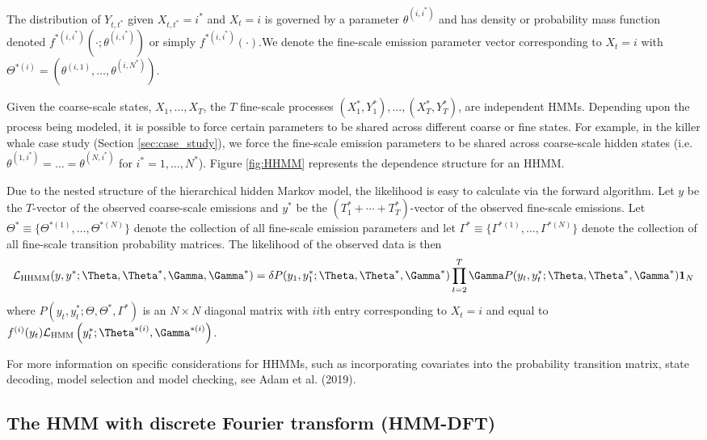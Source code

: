 The distribution of $Y_{t, t^*}$ given $X_{t, t^*}=i^*$ and $X_t=i$ is governed by a parameter $\theta^{(i,i^*)}$ and has density or probability mass function denoted $f^{*(i,i^*)}\left(\cdot; \theta^{(i,i^*)}\right)$ or simply $f^{*(i,i^*)}(\cdot)$.We denote the fine-scale emission parameter vector corresponding to $X_t=i$ with $\Theta^{*(i)}=\left(\theta^{(i,1)}, \ldots, \theta^{(i,N^*)}\right)$.

Given the coarse-scale states, $X_1,\ldots, X_T$, the $T$ fine-scale processes $(X_1^*, Y_1^*), \ldots, (X_T^*, Y_T^*)$, are independent HMMs. Depending upon the process being modeled, it is possible to force certain parameters to be shared across different coarse or fine states. For example, in the killer whale case study (Section \ref{sec:case_study}), we force the fine-scale emission parameters to be shared across coarse-scale hidden states (i.e. $\theta^{(1,i^*)} = \ldots = \theta^{(N,i^*)}$ for $i^* = 1, \ldots, N^*$). Figure \ref{fig:HHMM} represents the dependence structure for an HHMM.

Due to the nested structure of the hierarchical hidden Markov model, the likelihood is easy to calculate via the forward algorithm.
%
Let $y$ be the $T$-vector of the observed coarse-scale emissions and
$y^*$ be the $(T_1^* + \cdots + T_T^*)$-vector of the observed fine-scale emissions.
%
Let $\Theta^* \equiv \{\Theta^{*(1)}, \ldots, \Theta^{*(N)}\}$ denote the collection of all fine-scale emission parameters and let $\Gamma^* \equiv \{\Gamma^{*(1)}, \ldots, \Gamma^{*(N)}\}$ denote the collection of all fine-scale transition probability matrices. The likelihood of the observed data is then
%
\[
\calL_{\text{HHMM}}(y,y^*;\Theta,\Theta^*,\Gamma,\Gamma^*) = \delta P(y_1,y_1^*;\Theta,\Theta^*,\Gamma^*) \prod_{t=2}^T \Gamma P(y_t,y_t^*;\Theta,\Theta^*,\Gamma^*) \mathbf{1}_N
\]
%
where $P(y_t,y_t^*;\Theta,\Theta^*,\Gamma^*)$ is an $N \times N$ diagonal matrix with $ii$th entry corresponding to $X_t=i$ and equal to 
$f^{(i)}(y_t)\calL_{\text{HMM}}\left(y_t^*;\Theta^{*(i)},
\Gamma^{*(i)}\right)$. 

For more information on specific considerations for HHMMs, such as incorporating covariates into the probability transition matrix, state decoding, model selection and model checking, see Adam et al. (2019).

\subsection{The HMM with discrete Fourier transform (HMM-DFT)}
\label{subsec:STFT}

